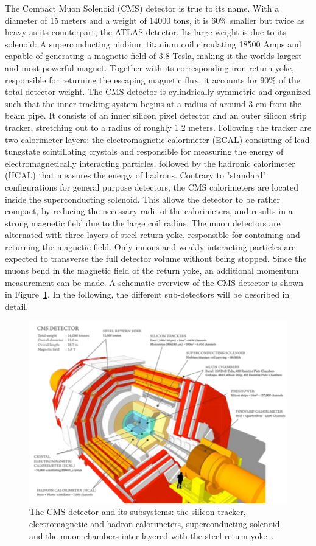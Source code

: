 The Compact Muon Solenoid (CMS) detector is true to its name. With a diameter of 15 meters and a weight of 14000 tons, it is 60\% smaller but twice as heavy as its counterpart, the ATLAS detector.
Its large weight is due to its solenoid: A superconducting niobium titanium coil circulating 18500 Amps and capable of generating a magnetic field of 3.8 Tesla, making it the worlds largest and most powerful magnet. Together with its corresponding iron return yoke, responsible for returning the escaping magnetic flux, it accounts for 90\% of the total detector weight.
The CMS detector is cylindrically symmetric and organized such that the inner tracking system begins at a radius of around 3 cm from the beam pipe. It consists of an inner silicon pixel detector and an outer silicon strip tracker, stretching out to a radius of roughly 1.2 meters. Following the tracker are two calorimeter layers: the electromagnetic calorimeter (ECAL) consisting of lead tungstate scintillating crystals and responsible for measuring the energy of electromagnetically interacting particles, followed by the hadronic calorimeter (HCAL) that measures the energy of hadrons.
Contrary to "standard" configurations for general purpose detectors, the CMS calorimeters are located inside the superconducting solenoid. This allows the detector to be rather compact, by reducing the necessary radii of the calorimeters, and results in a strong magnetic field due to the large coil radius. The muon detectors are alternated with three layers of steel return yoke, responsible for containing and returning the magnetic field. Only muons and weakly interacting particles are expected to transverse the full detector volume without being stopped. Since the muons bend in the magnetic field of the return yoke, an additional momentum measurement can be made. A schematic overview of the CMS detector is shown in Figure~\ref{fig:cms:CMS}. In the following, the different sub-detectors will be described in detail.
\begin{figure}[h] 
    \centering
    \includegraphics[width=1.0\textwidth]{figures/cms/CMS.pdf}
    \caption{The CMS detector and its subsystems: the silicon tracker, electromagnetic and hadron calorimeters, superconducting solenoid and the muon chambers inter-layered with the steel return yoke~\cite{CMS}.}
    \label{fig:cms:CMS}
\end{figure}

